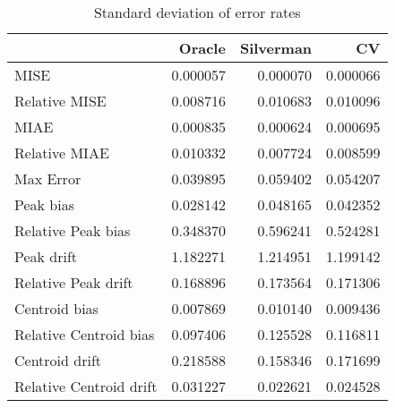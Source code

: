 \begin{table}[H]
\centering
\begin{tabular}{lrrr}
  \hline
 & Oracle & Silverman & CV \\ 
  \hline
MISE & 0.000057 & 0.000070 & 0.000066 \\ 
  Relative MISE & 0.008716 & 0.010683 & 0.010096 \\ 
  MIAE & 0.000835 & 0.000624 & 0.000695 \\ 
  Relative MIAE & 0.010332 & 0.007724 & 0.008599 \\ 
  Max Error & 0.039895 & 0.059402 & 0.054207 \\ 
  Peak bias & 0.028142 & 0.048165 & 0.042352 \\ 
  Relative Peak bias & 0.348370 & 0.596241 & 0.524281 \\ 
  Peak drift & 1.182271 & 1.214951 & 1.199142 \\ 
  Relative Peak drift & 0.168896 & 0.173564 & 0.171306 \\ 
  Centroid bias & 0.007869 & 0.010140 & 0.009436 \\ 
  Relative Centroid bias & 0.097406 & 0.125528 & 0.116811 \\ 
  Centroid drift & 0.218588 & 0.158346 & 0.171699 \\ 
  Relative Centroid drift & 0.031227 & 0.022621 & 0.024528 \\ 
   \hline
\end{tabular}
\caption{Standard deviation of error rates} 
\label{tbl:stddev_error_rates}
\end{table}
